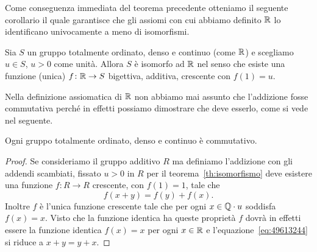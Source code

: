Come conseguenza immediata del teorema precedente otteniamo il seguente corollario il quale
garantisce che gli assiomi con cui abbiamo definito $\RR$
lo identificano univocamente a meno di isomorfismi.

\begin{corollary}[unicità di $\RR$]%
  \label{th:unicitaR}%
  Sia $S$ un gruppo totalmente ordinato, denso e continuo (come $\RR$)
  e scegliamo $u\in S$, $u>0$ come unità.
  Allora $S$ è isomorfo ad $\RR$ nel senso che esiste una funzione (unica)
  $f\colon {\mathbb R}\to S$ bigettiva, additiva, crescente con $f(1)=u$.
\end{corollary}

Nella definizione assiomatica di $\RR$ non abbiamo mai assunto che l'addizione fosse 
commutativa perché in effetti possiamo dimostrare che deve esserlo, come si vede nel seguente.
\begin{theorem}
Ogni gruppo totalmente ordinato, denso e continuo 
è commutativo.
\end{theorem}
%
\begin{proof}
Se consideriamo il gruppo additivo $R$ ma definiamo 
l'addizione con gli addendi scambiati, 
fissato $u>0$ in $R$
per il teorema~\ref{th:isomorfismo}
deve esistere una funzione $f\colon R\to R$ crescente, con $f(1)=1$, tale che 
\begin{equation}\label{eq:49613244}
  f(x+y) = f(y)+f(x).
\end{equation}
Inoltre $f$ è l'unica funzione crescente tale che 
per ogni $x\in {\mathbb Q}\cdot u$ soddisfa $f(x)=x$. 
Visto che la funzione identica ha queste proprietà 
$f$ dovrà in effetti essere la funzione identica $f(x)=x$ 
per ogni $x\in {\mathbb R}$ 
e l'equazione~\eqref{eq:49613244} si riduce a $x+y=y+x$.
\end{proof}

